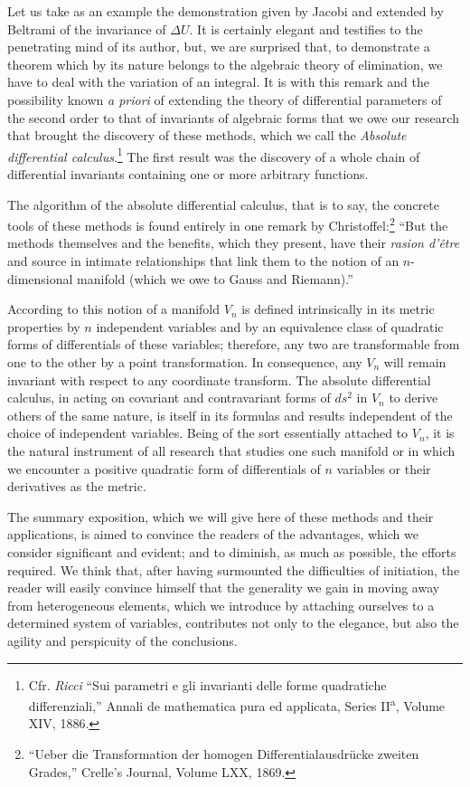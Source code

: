 \documentclass{book}
\begin{document}
Let us take as an example the demonstration given by Jacobi and extended by Beltrami of the invariance of $\Delta U$. It is certainly elegant and testifies to the penetrating mind of its author, but, we are surprised that, to demonstrate a theorem which by its nature belongs to the algebraic theory of elimination, we have to deal with the variation of an integral. It is with this remark and the possibility known \emph{a priori} of extending the theory of differential parameters of the second order to that of invariants of algebraic forms that we owe our research that brought the discovery of these methods, which we call the \emph{Absolute differential calculus}.\footnote{Cfr. \emph{Ricci} ``Sui parametri e gli invarianti delle forme quadratiche differenziali,'' Annali de mathematica pura ed applicata, Series II\textsuperscript{a}, Volume XIV, 1886.} The first result was the discovery of a whole chain of differential invariants containing one or more arbitrary functions.

The algorithm of the absolute differential calculus, that is to say, the concrete tools of these methods is found entirely in one remark by Christoffel:\footnote{``Ueber die Transformation der homogen Differentialausdr\"{u}cke zweiten Grades,'' Crelle's Journal, Volume LXX, 1869.} ``But the methods themselves and the benefits, which they present, have their \emph{rasion d'\^{e}tre} and source in intimate relationships that link them to the notion of an $n$-dimensional manifold (which we owe to Gauss and Riemann).''

According to this notion of a manifold $V_n$ is defined intrinsically in its metric properties by $n$ independent variables and by an equivalence class of quadratic forms of differentials of these variables; therefore, any two are transformable from one to the other by a point transformation. In consequence, any $V_n$ will remain invariant with respect to any coordinate transform. The absolute differential calculus, in acting on covariant and contravariant forms of $ds^2$ in $V_n$ to derive others of the same nature, is itself in its formulas and results independent of the choice of independent variables. Being of the sort essentially attached to $V_n$, it is the natural instrument of all research that studies one such manifold or in which we encounter a positive quadratic form of differentials of $n$ variables or their derivatives as the metric.

The summary exposition, which we will give here of these methods and their applications, is aimed to convince the readers of the advantages, which we consider significant and evident; and to diminish, as much as possible, the efforts required. We think that, after having surmounted the difficulties of initiation, the reader will easily convince himself that the generality we gain in moving away from heterogeneous elements, which we introduce by attaching ourselves to a determined system of variables, contributes not only to the elegance, but also the agility and perspicuity of the conclusions.
\end{document}
